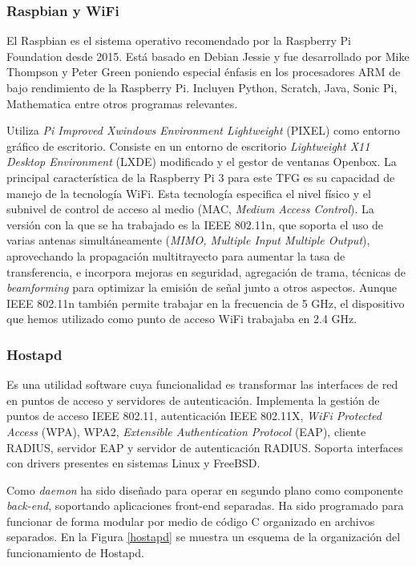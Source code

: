\subsubsection{Raspbian y WiFi}

El Raspbian es el sistema operativo recomendado por la Raspberry Pi Foundation desde 2015. Está basado en Debian Jessie y fue desarrollado por Mike Thompson y Peter Green poniendo especial énfasis en los procesadores \acrshort{ARM} de bajo rendimiento de la Raspberry Pi. Incluyen Python, Scratch, Java, Sonic Pi, Mathematica entre otros programas relevantes.

Utiliza \emph{Pi Improved Xwindows Environment Lightweight} (\acrshort{PIXEL}) como entorno gráfico de escritorio. Consiste en un entorno de escritorio \emph{Lightweight X11 Desktop Environment} (\acrshort{LXDE}) modificado y el gestor de ventanas Openbox.
La principal característica de la Raspberry Pi 3 para este TFG es su capacidad de manejo de la tecnología WiFi. Esta tecnología especifica el nivel físico y el subnivel de control de acceso al medio (\acrshort{MAC}, \emph{Medium Access Control}). La versión con la que se ha trabajado es la \acrshort{IEEE} 802.11n, que soporta el uso de varias antenas simultáneamente (\emph{\acrshort{MIMO}, Multiple Input Multiple Output}), aprovechando la propagación multitrayecto para aumentar la tasa de transferencia, e incorpora mejoras en seguridad, agregación de trama, técnicas de \emph{beamforming} para optimizar la emisión de señal junto a otros aspectos. Aunque \acrshort{IEEE} 802.11n también permite trabajar en la frecuencia de 5 GHz, el dispositivo que hemos utilizado como punto de acceso \acrshort{WiFi} trabajaba en 2.4 GHz.

\subsubsection{Hostapd}

Es una utilidad software cuya funcionalidad es transformar las interfaces de red en puntos de acceso y servidores de autenticación. Implementa la gestión de puntos de acceso \acrshort{IEEE} 802.11, autenticación \acrshort{IEEE} 802.11X, \emph{\acrshort{WiFi} Protected Access} (WPA), \acrshort{WPA2}, \emph{Extensible Authentication Protocol} (\acrshort{EAP}), cliente \acrshort{RADIUS}, servidor \acrshort{EAP} y servidor de autenticación \acrshort{RADIUS}. Soporta interfaces con drivers presentes en sistemas Linux y FreeBSD.

Como \emph{daemon} ha sido diseñado para operar en segundo plano como componente \emph{back-end}, soportando aplicaciones front-end separadas. Ha sido programado para funcionar de forma modular por medio de código C organizado en archivos separados. En la Figura \ref{hostapd} se muestra un esquema de la organización del funcionamiento de \acrshort{Hostapd}.

